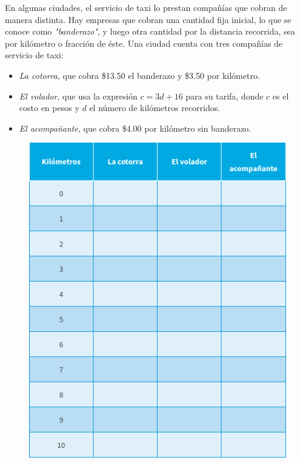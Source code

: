\documentclass[11pt]{book}
\begin{document}
\begin{enumerate}
        \begin{minipage}[t]{0.45\linewidth}
          \item En algunas ciudades, el servicio de taxi lo prestan compañías que cobran de manera distinta. Hay empresas que
          cobran una cantidad fija inicial, lo que se conoce como \emph{"banderazo"}, y luego otra cantidad por la distancia
          recorrida, sea por kilómetro o fracción de éste. Una ciudad cuenta con tres compañías de servicio de taxi:\\
          \begin{itemize}
            \item \emph{La cotorra}, que cobra \$13.50 el banderazo y \$3.50 por kilómetro.
            \item \emph{El volador}, que usa la expresión $c = 3d + 16$ para su tarifa, donde $c$ es el costo en pesos y $d$
                  el número de kilómetros recorridos.
            \item \emph{El acompañante}, que cobra \$4.00 por kilómetro sin banderazo.
          \end{itemize}
        \end{minipage}\hfill
        \begin{minipage}[t]{0.5\linewidth}
          \begin{figure}[H]
            \includegraphics[width=\linewidth]{taxi}
            \label{fig:taxi}
          \end{figure}
        \end{minipage}


\end{enumerate}
\end{document}

